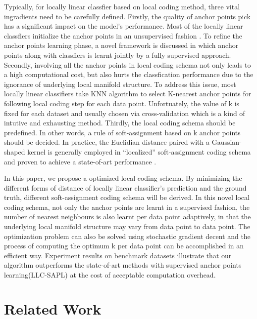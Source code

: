 \documentclass{llncs}
\begin{document}
	Typically, for locally linear classfier based on local coding method, three vital ingradients need to be carefully defined. Firstly, the quality of anchor points pick has a significant impact on the model's performance. Most of the locally linear classfiers initialize the anchor points in an unsupervised fashion \cite{2} \cite{5}. To refine the anchor points learning phase, a novel framework is discussed \cite{4} in which anchor points along with classfiers is learnt jointly by a fully supervised approach. Secondly, involving all the anchor points in local coding schema not only leads to a high computational cost, but also hurts the classfication performance due to the ignorance of underlying local manifold structure. To address this issue, most locally linear classifiers \cite{2} \cite{4} take KNN algorithm \cite{7} to select K-nearest anchor points for following local coding step for each data point. Unfortuately, the value of k is fixed for each dataset and usually chosen via cross-validation which is a kind of intutive and exhausting method. Thirdly, the local coding schema should be predefined. In other words, a rule of soft-assignment based on k anchor points should be decided. In practice, the Euclidian distance paired with a Gaussian-shaped kernel \cite{8} \cite{9} is generally employed in ``localized'' soft-assignment coding schema and proven to achieve a state-of-art performance \cite{2} \cite{4}.
	
	In this paper, we propose a optimized local coding schema. By minimizing the different forms of distance of locally linear classifier's prediction and the ground truth, different soft-assignment coding schema will be derived. In this novel local coding schema, not only the anchor points are learnt in a supervised fashion, the number of nearest neighbours is also learnt per data point adaptively, in that the underlying local manifold structure may vary from data point to data point. The optimization problem can also be solved using stochastic gradient decent and the process of computing the optimum k per data point can be accomplished in an efficient way. Experiment results on benchmark datasets illustrate that our algorithm outperforms the state-of-art methods with supervised anchor points learning(LLC-SAPL) \cite{4} at the cost of acceptable computation overhead.
	\section{Related Work}
\end{document}
